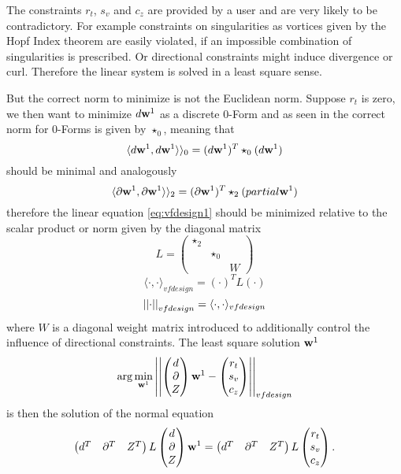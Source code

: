 The constraints $r_t$, $s_v$ and $c_z$ are provided by a user and are very likely to be contradictory. For example constraints on singularities as vortices given by the Hopf Index theorem are easily violated, if an impossible combination of singularities is prescribed. Or directional constraints might induce divergence or curl. Therefore the linear system is solved in a least square sense.

But the correct norm to minimize is not the Euclidean norm. Suppose $r_t$ is zero, we then want to minimize $d\textbf{w}^1$ as a discrete $0$-Form and as seen in  the correct norm for $0$-Forms is given by $\star_0$, meaning that
\[\langle d\textbf{w}^1, d\textbf{w}^1\rangle \rangle_0 = (d\textbf{w}^1)^T \star_0 (d\textbf{w}^1)
\]
should be minimal and analogously
\[\langle \partial \textbf{w}^1, \partial\textbf{w}^1\rangle \rangle_2 = (\partial\textbf{w}^1)^T \star_2 (partial\textbf{w}^1)\]
therefore the linear equation \ref{eq:vfdesign1}
should be minimized relative to the scalar product or norm given by the diagonal matrix
\[L = \begin{pmatrix}
\star_2 & & \\
 & \star_0 & \\
 & & W
\end{pmatrix}\]
\[\langle \cdot , \cdot\rangle_{vfdesign} = (\cdot)^T L (\cdot)\]
\[\left| \left|  \cdot \right| \right|_{vfdesign} = \langle \cdot,\cdot \rangle_{vfdesign}\]
where $W$ is a diagonal weight matrix introduced to additionally control the influence of directional constraints. The least square solution $\textbf{w}^1$ 
\[\arg\min_{\textbf{w}^1}\left| \left| \begin{pmatrix} d \\
\partial \\
Z
\end{pmatrix} 
\textbf{w}^1 - \begin{pmatrix}
r_t \\
s_v \\
c_z
\end{pmatrix} \right| \right|_{vfdesign}\]
is then the solution of the normal equation 
\[\begin{pmatrix} d^T & \partial^T & Z^T \end{pmatrix} L \begin{pmatrix} d \\
\partial \\
Z
\end{pmatrix} \textbf{w}^1= \begin{pmatrix} d^T & \partial^T & Z^T \end{pmatrix} L \begin{pmatrix}
r_t \\
s_v \\
c_z
\end{pmatrix}.\]

